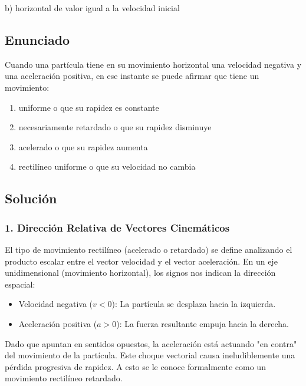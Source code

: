 \documentclass[12pt, a4paper]{article}
\begin{document}
\begin{tcolorbox}[colback=green!5!white, colframe=green!50!black, title=Respuesta Final]
\centering \Large b) horizontal de valor igual a la velocidad inicial
\end{tcolorbox}

\newpage

\subsection*{Enunciado}
Cuando una partícula tiene en su movimiento horizontal una velocidad negativa y una aceleración positiva, en ese instante se puede afirmar que tiene un movimiento:
\begin{enumerate}[label=\alph*)]
    \item uniforme o que su rapidez es constante
    \item necesariamente retardado o que su rapidez disminuye
    \item acelerado o que su rapidez aumenta
    \item rectilíneo uniforme o que su velocidad no cambia
\end{enumerate}

\subsection*{Solución}

\subsubsection*{1. Dirección Relativa de Vectores Cinemáticos}
El tipo de movimiento rectilíneo (acelerado o retardado) se define analizando el producto escalar entre el vector velocidad y el vector aceleración. 
En un eje unidimensional (movimiento horizontal), los signos nos indican la dirección espacial:
\begin{itemize}
    \item Velocidad negativa ($v < 0$): La partícula se desplaza hacia la izquierda.
    \item Aceleración positiva ($a > 0$): La fuerza resultante empuja hacia la derecha.
\end{itemize}
Dado que apuntan en sentidos opuestos, la aceleración está actuando "en contra" del movimiento de la partícula. Este choque vectorial causa ineludiblemente una pérdida progresiva de rapidez. A esto se le conoce formalmente como un movimiento rectilíneo retardado.
\end{document}
